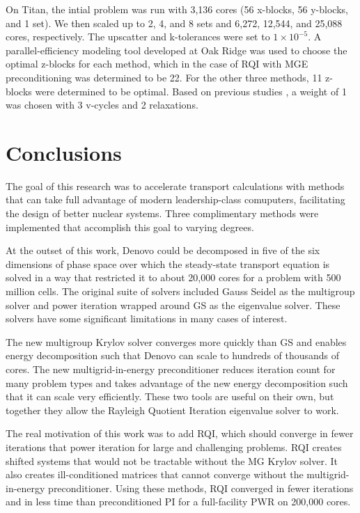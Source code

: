 \documentclass[preprint,12pt]{elsarticle}
\begin{document}
On Titan, the intial problem was run with 3,136 cores (56 x-blocks, 56 y-blocks, and 1 set). We then scaled up to 2, 4, and 8 sets and 6,272, 12,544, and 25,088 cores, respectively. The upscatter and k-tolerances were set to $1 \times 10^{-5}$. A parallel-efficiency modeling tool developed at Oak Ridge was used to choose the optimal z-blocks for each method, which in the case of RQI with MGE preconditioning was determined to be 22. For the other three methods, 11 z-blocks were determined to be optimal. Based on previous studies \cite{Slaybaugh2015}, a weight of 1 was chosen with 3 v-cycles and 2 relaxations. 

\section{Conclusions}
\label{sec:conclusions}
The goal of this research was to accelerate transport calculations with methods that can take full advantage of modern leadership-class comuputers, facilitating the design of better nuclear systems. Three complimentary methods were implemented that accomplish this goal to varying degrees. 

At the outset of this work, Denovo could be decomposed in five of the six dimensions of phase space over which the steady-state transport equation is solved in a way that restricted it to about 20,000 cores for a problem with 500 million cells. The original suite of solvers included Gauss Seidel as the multigroup solver and power iteration wrapped around GS as the eigenvalue solver. These solvers have some significant limitations in many cases of interest. 

The new multigroup Krylov solver converges more quickly than GS and enables energy decomposition such that Denovo can scale to hundreds of thousands of cores. The new multigrid-in-energy preconditioner reduces iteration count for many problem types and takes advantage of the new energy decomposition such that it can scale very efficiently. These two tools are useful on their own, but together they allow the Rayleigh Quotient Iteration eigenvalue solver to work.

The real motivation of this work was to add RQI, which should converge in fewer iterations that power iteration for large and challenging problems. RQI creates shifted systems that would not be tractable without the MG Krylov solver. It also creates ill-conditioned matrices that cannot converge without the multigrid-in-energy preconditioner. Using these methods, RQI converged in fewer iterations and in less time than preconditioned PI for a full-facility PWR on 200,000 cores. 
\end{document}
